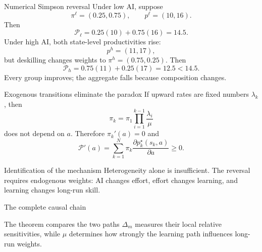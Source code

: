 \documentclass[aspectratio=169,10pt]{beamer}
\newcommand{\calP}{\mathcal{P}}
\begin{document}
\begin{frame}{Numerical Simpson reversal}
Under low AI, suppose
\[
\pi^\ell=(0.25,0.75),
\qquad
p^\ell=(10,16).
\]
Then
\[
\calP_\ell=0.25(10)+0.75(16)=14.5.
\]
Under high AI, both state-level productivities rise:
\[
p^h=(11,17),
\]
but deskilling changes weights to $\pi^h=(0.75,0.25)$. Then
\[
\calP_h=0.75(11)+0.25(17)=12.5<14.5.
\]
Every group improves; the aggregate falls because composition changes.
\end{frame}

\begin{frame}{Exogenous transitions eliminate the paradox}
If upward rates are fixed numbers $\lambda_k$, then
\[
\pi_k=
\pi_1
\prod_{i=1}^{k-1}
\frac{\lambda_i}{\mu}
\]
does not depend on $a$. Therefore $\pi_k'(a)=0$ and
\[
\calP'(a)=
\sum_{k=1}^N
\pi_k
\frac{\partial p_k^\star(s_k,a)}
{\partial a}
\ge0.
\]
\begin{alertblock}{Identification of the mechanism}
Heterogeneity alone is insufficient. The reversal requires endogenous weights: AI changes effort, effort changes learning, and learning changes long-run skill.
\end{alertblock}
\end{frame}

\begin{frame}{The complete causal chain}
\centering
{}
\vspace{6mm}
\begin{block}{The theorem compares the two paths}
$\Delta_m$ measures their local relative sensitivities, while $\mu$ determines how strongly the learning path influences long-run weights.
\end{block}
\end{frame}
\end{document}
